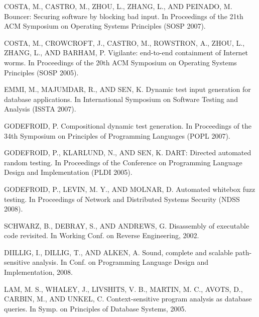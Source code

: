 \documentclass[conference]{IEEEtran}
\begin{document}
\begin{thebibliography}{1}
COSTA, M., CASTRO, M., ZHOU, L., ZHANG, L., AND PEINADO, M. Bouncer: Securing software by blocking bad input. In Proceedings of the 21th ACM Symposium on Operating Systems Principles (SOSP 2007).

COSTA, M., CROWCROFT, J., CASTRO, M., ROWSTRON, A., ZHOU, L., ZHANG, L., AND BARHAM, P. Vigilante: end-to-end containment of Internet worms. In Proceedings of the 20th ACM Symposium on Operating Systems Principles (SOSP 2005).

EMMI, M., MAJUMDAR, R., AND SEN, K. Dynamic test input generation for database applications. In International Symposium on Software Testing and Analysis (ISSTA 2007).

GODEFROID, P. Compositional dynamic test generation. In Proceedings of the 34th Symposium on Principles of Programming Languages (POPL 2007).

GODEFROID, P., KLARLUND, N., AND SEN, K. DART: Directed automated random testing. In Proceedings of the Conference on Programming Language Design and Implementation (PLDI 2005).

GODEFROID, P., LEVIN, M. Y., AND MOLNAR, D. Automated whitebox fuzz testing. In Proceedings of Network and Distributed Systems Security (NDSS 2008).

SCHWARZ, B., DEBRAY, S., AND ANDREWS, G. Disassembly of executable code revisited. In Working Conf. on Reverse Engineering, 2002.

DIILLIG, I., DILLIG, T., AND ALKEN, A. Sound, complete and scalable path- sensitive analysis. In Conf. on Programming Language Design and Implementation, 2008.

LAM, M. S., WHALEY, J., LIVSHITS, V. B., MARTIN, M. C., AVOTS, D., CARBIN, M., AND UNKEL, C. Context-sensitive program analysis as
database queries. In Symp. on Principles of Database Systems, 2005.

\end{thebibliography}

\end{document}
